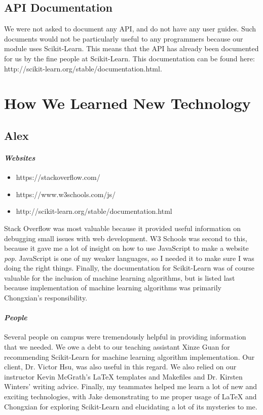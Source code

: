 \documentclass[onecolumn, draftclsnofoot,10pt, compsoc]{IEEEtran}
\begin{document}
\subsection{API Documentation}
We were not asked to document any API, and do not have any user guides. Such documents would not be particularly useful to any programmers because our module uses Scikit-Learn. This means that the API has already been documented for us by the fine people at Scikit-Learn. This documentation can be found here: http://scikit-learn.org/stable/documentation.html.

\section{How We Learned New Technology}
\subsection{Alex}
\paragraph{\emph{Websites}}
\begin{itemize}
\item https://stackoverflow.com/ 
\item https://www.w3schools.com/js/
\item http://scikit-learn.org/stable/documentation.html
\end{itemize}
Stack Overflow was most valuable because it provided useful information on debugging small issues with web development. W3 Schools was second to this, because it gave me a lot of insight on how to use JavaScript to make a website \emph{pop}. JavaScript is one of my weaker languages, so I needed it to make sure I was doing the right things. Finally, the documentation for Scikit-Learn was of course valuable for the inclusion of machine learning algorithms, but is listed last because implementation of machine learning algorithms was primarily Chongxian's responsibility.
\paragraph{\emph{People}}
Several people on campus were tremendously helpful in providing information that we needed. We owe a debt to our teaching assistant Xinze Guan for recommending Scikit-Learn for machine learning algorithm implementation. Our client, Dr. Victor Hsu, was also useful in this regard. We also relied on our instructor Kevin McGrath's LaTeX templates and Makefiles and Dr. Kirsten Winters' writing advice. Finally, my teammates helped me learn a lot of new and exciting technologies, with Jake demonstrating to me proper usage of LaTeX and Chongxian for exploring Scikit-Learn and elucidating a lot of its mysteries to me. 
\end{document}
